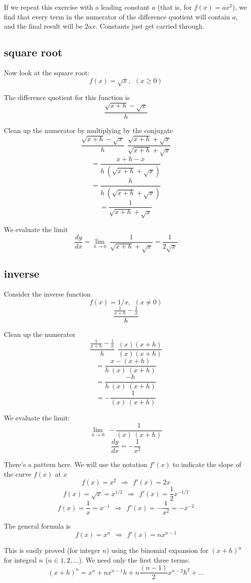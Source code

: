 \documentclass[11pt, oneside]{article}
\begin{document}
If we repeat this exercise with a leading constant $a$ (that is, for $f(x) = ax^2$), we find that every term in the numerator of the difference quotient will contain $a$, and the final result will be $2ax$.  Constants just get carried through.

\subsection*{square root}

Now look at the square root:
\[  f(x)=\sqrt{x}, \ \ (x \ge 0) \]

The difference quotient for this function is
\[   \frac{\sqrt{x+h} - \sqrt{x}}{h} \]

Clean up the numerator by multiplying by the conjugate
\[    \frac{\sqrt{x+h} - \sqrt{x}}{h} \ \  \frac{\sqrt{x+h} + \sqrt{x}}{\sqrt{x+h} + \sqrt{x}} \]
\[    = \frac{x + h - x}{h \ (\sqrt{x+h} + \sqrt{x})} \]
\[    = \frac{h}{h \ (\sqrt{x+h} + \sqrt{x}) } \]
\[    = \frac{1}{\sqrt{x+h} + \sqrt{x}} \]

We evaluate the limit
\[    \frac{dy}{dx} = \lim_{h \to 0} \  \frac{1}{\sqrt{x+h} + \sqrt{x}} = \frac{1}{2\sqrt{x}} \]

\subsection*{inverse}

Consider the inverse function
\[   f(x)=1/x, \ \ (x \ne 0) \]
\[    \frac {  \frac{1}{x+h} - \frac{1}{x}  }  {h} \]

Clean up the numerator
\[    \frac {  \frac{1}{x+h} - \frac{1}{x}  }  {h} \ \  \frac{(x)(x+h)}{(x)(x+h)} \]
\[    = \frac {x - (x+h)}  {h\ (x) \ (x+h)} \]
\[    = \frac {-h}  {h\ (x) \ (x+h)} \]
\[    = -\frac {1}  {(x) \ (x+h)} \]

We evaluate the limit:
\[    \lim_{h \to 0} \  -\frac {1}  {(x) \ (x+h)} \]
\[ \frac{dy}{dx} = - \frac{1}{x^2} \]

There's a pattern here.  We will use the notation $f'(x)$ to indicate the slope of the curve $f(x)$ at $x$
\[       f(x) = x^2 \ \ \Rightarrow \ \  f'(x) = 2x \]
\[       f(x) = \sqrt{x} = x^{1/2}\ \ \Rightarrow \ \  f'(x) = \frac{1}{2}x^{-1/2} \]
\[       f(x) = \frac{1}{x} = x^{-1} \ \ \Rightarrow \ \  f'(x) = -\frac{1}{x^2} = -x^{-2} \]

The general formula is
\[       f(x) = x^n \ \ \Rightarrow \ \  f'(x) = nx^{n-1} \]

This is easily proved (for integer $n$) using the binomial expansion for $(x + h)^n$ for integral $n$ ($n \in 1,2, \dots$).  We need only the first three terms:
\[         (x + h)^n = x^n + n x^{n-1} h + n\frac{(n-1)}{2}x^{n-2} h^2 + \dots  \]
\end{document}
